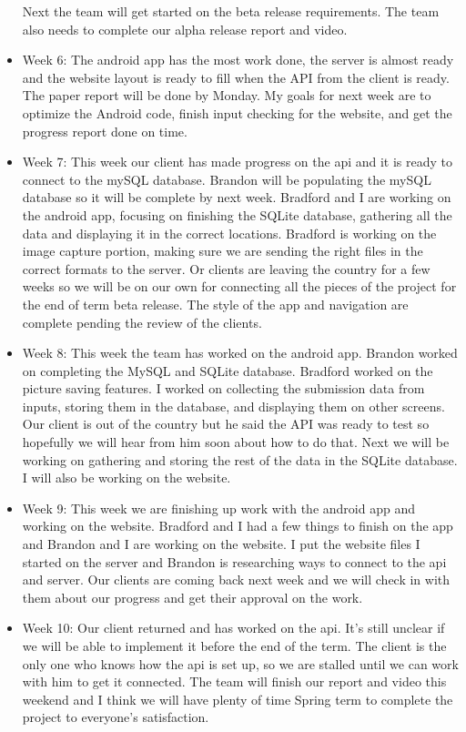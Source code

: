 \documentclass[onecolumn, draftclsnofoot,10pt, compsoc]{IEEEtran}
\begin{document}
\begin{itemize}
Next the team will get started on the beta release requirements. The team also needs to complete our alpha release report and video. 
     \item Week 6: The android app has the most work done, the server is almost ready and the website layout is ready to fill when the API from the client is ready. The paper report will be done by Monday. My goals for next week are to optimize the Android code, finish input checking for the website, and get the progress report done on time. 
     \item Week 7: This week our client has made progress on the api and it is ready to connect to the mySQL database. Brandon will be populating the mySQL database so it will be complete by next week. Bradford and I are working on the android app, focusing on finishing the SQLite database, gathering all the data and displaying it in the correct locations. Bradford is working on the image capture portion, making sure we are sending the right files in the correct formats to the server. Or clients are leaving the country for a few weeks so we will be on our own for connecting all the pieces of the project for the end of term beta release. The style of the app and navigation are complete pending the review of the clients. 
     \item Week 8: This week the team has worked on the android app. Brandon worked on completing the MySQL and SQLite database. Bradford worked on the picture saving features. I worked on collecting the submission data from inputs, storing them in the database, and displaying them on other screens. Our client is out of the country but he said the API was ready to test so hopefully we will hear from him soon about how to do that. Next we will be working on gathering and storing the rest of the data in the SQLite database. I will also be working on the website. 
     \item Week 9: This week we are finishing up work with the android app and working on the website. Bradford and I had a few things to finish on the app and Brandon and I are working on the website. I put the website files I started on the server and Brandon is researching ways to connect to the api and server. Our clients are coming back next week and we will check in with them about our progress and get their approval on the work. 
     \item Week 10: Our client returned and has worked on the api. It's still unclear if we will be able to implement it before the end of the term. The client is the only one who knows how the api is set up, so we are stalled until we can work with him to get it connected. The team will finish our report and video this weekend and I think we will have plenty of time Spring term to complete the project to everyone's satisfaction.  
 \end{itemize}
\end{document}
